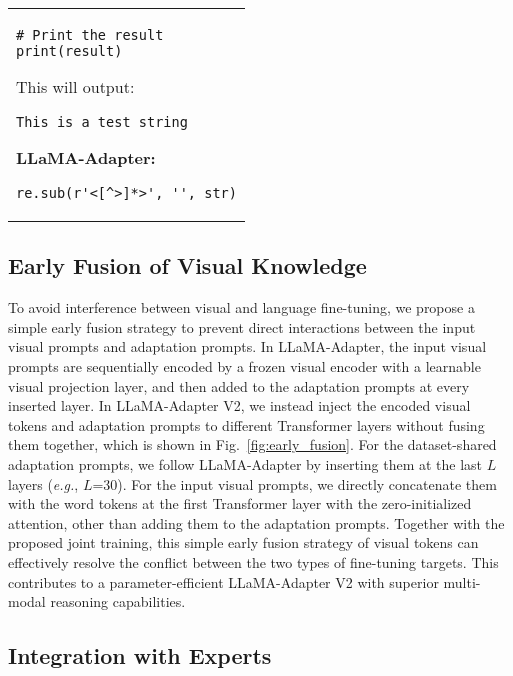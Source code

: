 \documentclass[10pt,twocolumn,letterpaper]{article}
\begin{document}
\begin{table*}[th]
\begin{tabular}{p{}}
\begin{framed}
\begin{minipage}{\textwidth}
\begin{lstlisting}
# Print the result
print(result)
\end{lstlisting}

This will output:

\begin{lstlisting}
This is a test string
\end{lstlisting}
{\bf LLaMA-Adapter:} 
\begin{lstlisting}
re.sub(r'<[^>]*>', '', str)
\end{lstlisting}
\end{minipage}
\end{framed}

\end{tabular}\vspace{-5mm}
\caption{\textbf{Comparisons of Instruction-following Ability} between LLaMA-Adapter V2 and LLaMA-Adapter.}
\label{tab:language_instruction_comparison}
\end{table*} 
\vspace{0.2cm}
\subsection{Early Fusion of Visual Knowledge}
\label{subsec:early_fusion}
To avoid interference between visual and language fine-tuning, we propose a simple early fusion strategy to prevent direct interactions between the input visual prompts and adaptation prompts.
In LLaMA-Adapter, the input visual prompts are sequentially encoded by a frozen visual encoder with a learnable visual projection layer, and then added to the adaptation prompts at every inserted layer.
In LLaMA-Adapter V2, we instead inject the encoded visual tokens and adaptation prompts to different Transformer layers without fusing them together, which is shown in Fig.~\ref{fig:early_fusion}. For the dataset-shared adaptation prompts, we follow LLaMA-Adapter by inserting them at the last $L$ layers (\emph{e.g.}, $L$=30). For the input visual prompts, we directly concatenate them with the word tokens at the first Transformer layer with the zero-initialized attention, other than adding them to the adaptation prompts. Together with the proposed joint training, this simple early fusion strategy of visual tokens can effectively resolve the conflict between the two types of fine-tuning targets. This contributes to a parameter-efficient LLaMA-Adapter V2 with superior multi-modal reasoning capabilities.

\vspace{0.2cm}
\subsection{Integration with Experts}
\label{subsec:with_experts}
\end{document}
